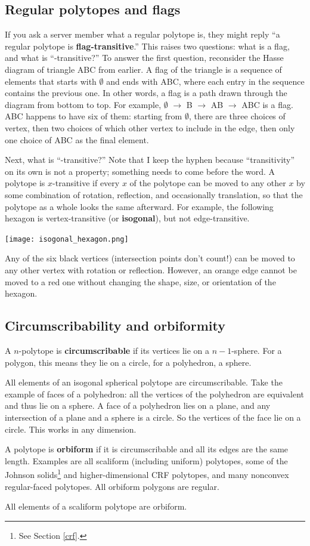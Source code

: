 \documentclass{article}
\begin{document}
\subsection{Regular polytopes and flags}
\label{flag}

If you ask a server member what a regular polytope is,
they might reply ``a regular polytope is \textbf{flag-transitive}.''
This raises two questions: what is a flag, and what is ``-transitive?''
To answer the first question, reconsider the Hasse diagram of triangle ABC from earlier.
A flag of the triangle is a sequence of elements that starts with $\emptyset$ and ends with ABC,
where each entry in the sequence contains the previous one.
In other words, a flag is a path drawn through the diagram from bottom to top.
For example, $\emptyset$ $\rightarrow$ B $\rightarrow$ AB $\rightarrow$ ABC is a flag.
ABC happens to have six of them:
starting from $\emptyset$, there are three choices of vertex,
then two choices of which other vertex to include in the edge,
then only one choice of ABC as the final element.

Next, what is ``-transitive?''
Note that I keep the hyphen
because ``transitivity'' on its own is not a property;
something needs to come before the word.
A polytope is $x$-transitive if
every $x$ of the polytope can be moved to any other $x$
by some combination of rotation, reflection, and occasionally translation,
so that the polytope as a whole looks the same afterward.
For example, the following hexagon is vertex-transitive (or \textbf{isogonal}),
but not edge-transitive.

\begin{center}
\texttt{[image: isogonal\_hexagon.png]}
\end{center}

Any of the six black vertices (intersection points don't count!)
can be moved to any other vertex with rotation or reflection.
However, an orange edge cannot be moved to a red one
without changing the shape, size, or orientation of the hexagon.

\subsection{Circumscribability and orbiformity}
\label{circum}

A $n$-polytope is \textbf{circumscribable} if its vertices lie on a $n-1$-sphere.
For a polygon, this means they lie on a circle, for a polyhedron, a sphere.

All elements of an isogonal spherical polytope are circumscribable. Take the example of
faces of a polyhedron: all the vertices of the polyhedron are equivalent and thus lie on a
sphere. A face of a polyhedron lies on a plane, and any intersection of a plane and a sphere
is a circle. So the vertices of the face lie on a circle. This works in any dimension.

A polytope is \textbf{orbiform} if it is circumscribable and all its edges are the same length.
Examples are all scaliform (including uniform) polytopes, some of the Johnson solids\footnote{
  See Section \ref{crf}.} and higher-dimensional CRF polytopes, and many nonconvex regular-faced
polytopes. All orbiform polygons are regular.

All elements of a scaliform polytope are orbiform.
\end{document}
